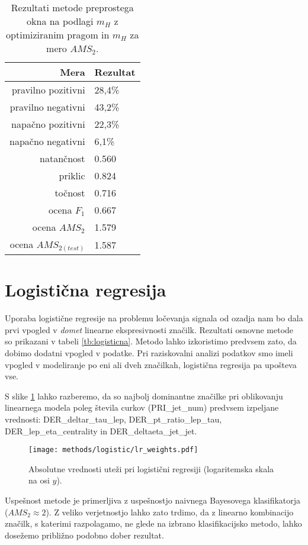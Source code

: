 \documentclass[11pt,a4paper,openany]{book}
\begin{document}
\begin{table}[ht]
	\centering
	\begin{tabular}{rl}
		\hline
		\textbf{Mera} & \textbf{Rezultat} \\
		\hline
		pravilno pozitivni & 28,4\%\\
		pravilno negativni & 43,2\% \\
		napačno pozitivni & 22,3\% \\
		napačno negativni & 6,1\% \\
		natančnost & 0.560 \\
		priklic & 0.824 \\
		točnost & 0.716 \\
		ocena $F_1$ & 0.667 \\
		ocena $AMS_2$ & 1.579 \\
		ocena $AMS_{2(test)}$ & 1.587 		
	\end{tabular}
	\caption{Rezultati metode preprostega okna na podlagi $m_H$ z optimiziranim pragom in $m_H$ za mero $AMS_2$.}
	\label{tb:preprosto_okno_2d_optimized}
\end{table}

\section{Logistična regresija}
Uporaba logistične regresije na problemu ločevanja signala od ozadja nam bo dala prvi vpogled v \textit{domet} linearne ekspresivnosti značilk. Rezultati osnovne metode so prikazani v tabeli \ref{tb:logisticna}. Metodo lahko izkoristimo predvsem zato, da dobimo dodatni vpogled v podatke. Pri raziskovalni analizi podatkov smo imeli vpogled v modeliranje po eni ali dveh značilkah, logistična regresija pa upošteva vse. 

S slike \ref{sl:logistic_weights} lahko razberemo, da so najbolj dominantne značilke pri oblikovanju linearnega modela poleg števila curkov (PRI\_jet\_num) predvsem izpeljane vrednosti: DER\_deltar\_tau\_lep, DER\_pt\_ratio\_lep\_tau, DER\_lep\_eta\_centrality in DER\_deltaeta\_jet\_jet.

\begin{figure}[h]
	\centering	
	\texttt{[image: methods/logistic/lr\_weights.pdf]}
	
	\caption{Absolutne vrednosti uteži pri logistični regresiji (logaritemska skala na osi $y$).}
	\label{sl:logistic_weights}
\end{figure}

Uspešnost metode je primerljiva z uspešnostjo naivnega Bayesovega klasifikatorja ($AMS_2 \approx 2$). Z veliko verjetnostjo lahko zato trdimo, da z linearno kombinacijo značilk, s katerimi razpolagamo, ne glede na izbrano klasifikacijsko metodo, lahko dosežemo približno podobno dober rezultat.
\end{document}
